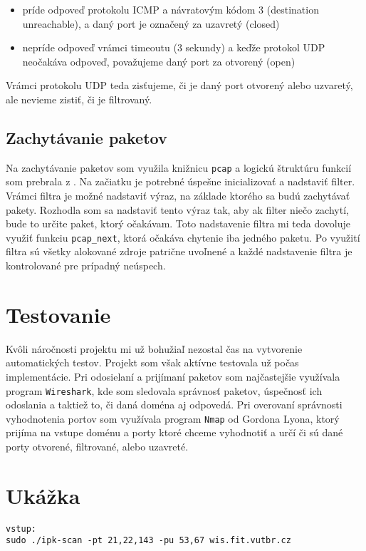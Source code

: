 \documentclass[11pt, a4paper]{article}
\begin{document}
\begin{itemize}
\item príde odpoveď protokolu ICMP a návratovým kódom 3 (destination unreachable), a daný port je označený za uzavretý (closed)
\item nepríde odpoveď vrámci timeoutu (3 sekundy) a keďže protokol UDP neočakáva odpoveď, považujeme daný port za otvorený (open)
\end{itemize}  

Vrámci protokolu UDP teda zisťujeme, či je daný port otvorený alebo uzvaretý, ale nevieme zistiť, či je filtrovaný.

\subsection{Zachytávanie paketov}
Na zachytávanie paketov som využila knižnicu \texttt{pcap} a logickú štruktúru funkcií som prebrala z \cite{pcap}. Na začiatku je potrebné úspešne inicializovať a nadstaviť filter. Vrámci filtra je možné nadstaviť výraz, na základe ktorého sa budú zachytávať pakety. Rozhodla som sa nadstaviť tento výraz tak, aby ak filter niečo zachytí, bude to určite paket, ktorý očakávam. Toto nadstavenie filtra mi teda dovoluje využiť funkciu \texttt{pcap\_next}, ktorá očakáva chytenie iba jedného paketu. Po využití filtra sú všetky alokované zdroje patrične uvoľnené a každé nadstavenie filtra je kontrolované pre prípadný neúspech.

\section{Testovanie}
Kvôli náročnosti projektu mi už bohužiaľ nezostal čas na vytvorenie automatických testov. Projekt som však aktívne testovala už počas implementácie. Pri odosielaní a prijímaní paketov som najčastejšie využívala  program \texttt{Wireshark}, kde som sledovala správnosť paketov, úspečnosť ich odoslania a taktiež to, či daná doména aj odpovedá. Pri overovaní správnosti vyhodnotenia portov som využívala program \texttt{Nmap} od Gordona Lyona, ktorý prijíma na vstupe doménu a porty ktoré chceme vyhodnotiť a určí či sú dané porty otvorené, filtrované, alebo uzavreté.

\section{Ukážka}
\texttt{vstup:} \\
\texttt{sudo ./ipk-scan -pt 21,22,143 -pu 53,67 wis.fit.vutbr.cz}\\
\end{document}
